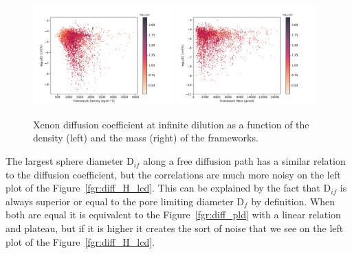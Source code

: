 \documentclass[main]{subfiles}
\begin{document}
\begin{figure}[ht]
  \centering
    \includegraphics[width=0.48\textwidth]{figures/5-diffusion/D_log-density_s_+.pdf}
    \includegraphics[width=0.48\textwidth]{figures/5-diffusion/D_log-mass_s_+.pdf}
    \caption{Xenon diffusion coefficient at infinite dilution as a function of the density (left) and the mass (right) of the frameworks. }\label{fgr:diff_density_mass}
\end{figure}

The largest sphere diameter D$_{if}$ along a free diffusion path has a similar relation to the diffusion coefficient, but the correlations are much more noisy on the left plot of the Figure~\ref{fgr:diff_H_lcd}.  This can be explained by the fact that D$_{if}$ is always superior or equal to the pore limiting diameter  D$_{f}$ by definition. When both are equal it is equivalent to the Figure~\ref{fgr:diff_pld} with a linear relation and plateau, but if it is higher it creates the sort of noise that we see on the left plot of the Figure~\ref{fgr:diff_H_lcd}. 
\end{document}
